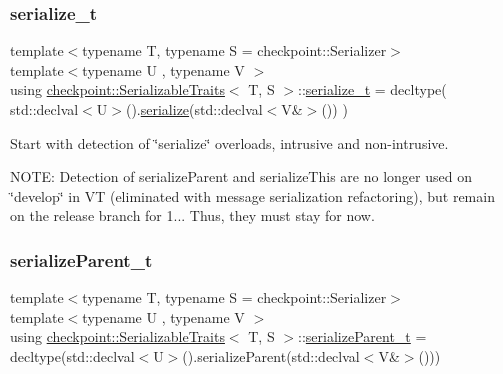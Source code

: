 \subsubsection{\texorpdfstring{serialize\+\_\+t}{serialize\_t}}
{\footnotesize\ttfamily template$<$typename T, typename S = checkpoint\+::\+Serializer$>$ \\
template$<$typename U , typename V $>$ \\
using \hyperlink{structcheckpoint_1_1_serializable_traits}{checkpoint\+::\+Serializable\+Traits}$<$ T, S $>$\+::\hyperlink{structcheckpoint_1_1_serializable_traits_a416ff19cd1038279ace5cb49e3a9fb7d}{serialize\+\_\+t} =  decltype( std\+::declval$<$U$>$().\hyperlink{namespacecheckpoint_a075da4e7344cf037943362517e606c3a}{serialize}(std\+::declval$<$V\&$>$()) )}

Start with detection of \char`\"{}serialize\char`\"{} overloads, intrusive and non-\/intrusive.

N\+O\+TE\+: Detection of {\ttfamily serialize\+Parent} and {\ttfamily serialize\+This} are no longer used on \char`\"{}develop\char`\"{} in VT (eliminated with message serialization refactoring), but remain on the release branch for 1... Thus, they must stay for now. \mbox{\label{structcheckpoint_1_1_serializable_traits_a38585e5b9aa0653c08ff48504e922ad5}} 
\subsubsection{\texorpdfstring{serialize\+Parent\+\_\+t}{serializeParent\_t}}
{\footnotesize\ttfamily template$<$typename T, typename S = checkpoint\+::\+Serializer$>$ \\
template$<$typename U , typename V $>$ \\
using \hyperlink{structcheckpoint_1_1_serializable_traits}{checkpoint\+::\+Serializable\+Traits}$<$ T, S $>$\+::\hyperlink{structcheckpoint_1_1_serializable_traits_a38585e5b9aa0653c08ff48504e922ad5}{serialize\+Parent\+\_\+t} =  decltype(std\+::declval$<$U$>$().serialize\+Parent(std\+::declval$<$V\&$>$()))}

\mbox{\label{structcheckpoint_1_1_serializable_traits_ac81eb64532a65d97dc995e582ef708ad}} 
